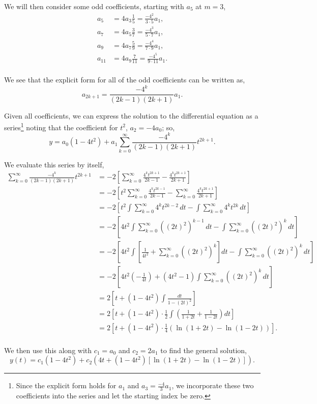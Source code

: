 \documentclass[../hw8]{subfiles}
\begin{document}
We will then consider some odd coefficients, starting with $a_5$ at $m=3$,
\begin{align*}
    a_5&=4a_3\frac{1}{5}=\frac{-4^2}{3\cdot5}a_1,\\
    a_7&=4a_5\frac{3}{7}=\frac{-4^3}{5\cdot7}a_1,\\
    a_9&=4a_7\frac{5}{9}=\frac{-4^4}{7\cdot9}a_1,\\
    a_{11}&=4a_9\frac{7}{11}=\frac{-4^5}{9\cdot11}a_1.\\
\end{align*}

We see that the explicit form for all of the odd coefficients can be written as,
\[a_{2k+1}=\frac{-4^k}{(2k-1)(2k+1)}a_1.\]

Given all coefficients, we can express the solution to the differential equation as a series\footnote{Since the explicit form holds for $a_1$ and $a_3=\frac{-4}{3}a_1$, we incorporate these two coefficients into the series and let the starting index be zero.} noting that the coefficient for $t^2$, $a_2=-4a_0$; so,
\[y=a_0(1-4t^2)+a_1\sum\limits_{k=0}^{\infty}\frac{-4^k}{(2k-1)(2k+1)}t^{2k+1}.\]

We evaluate this series by itself,
\begin{align*}
    \sum\limits_{k=0}^{\infty}\frac{-4^k}{(2k-1)(2k+1)}t^{2k+1}&=-2\left[ \sum\limits_{k=0}^{\infty} \frac{4^k t^{2k+1}}{2k-1}-\frac{4^k t^{2k+1}}{2k+1}\right]\\
    &=-2\left[ t^2 \sum\limits_{k=0}^{\infty}\frac{4^k t^{2k-1}}{2k-1} - \sum\limits_{k=0}^{\infty}\frac{4^k t^{2k+1}}{2k+1} \right]\\
    &=-2\left[ t^2 \int \sum\limits_{k=0}^{\infty}4^k t^{2k-2}\,dt - \int \sum\limits_{k=0}^{\infty}4^k t^{2k}\,dt \right]\\
    &=-2\left[ 4t^2 \int \sum\limits_{k=0}^{\infty}{\left( {(2t)}^2 \right)}^{k-1}\,dt - \int \sum\limits_{k=0}^{\infty}{\left( {(2t)}^2 \right)}^k\,dt\right] \\
    &=-2\left[ 4t^2 \int \left[ \frac{1}{4t^2} + \sum\limits_{k=0}^{\infty}{\left( {(2t)}^2 \right)}^k\right]dt - \int \sum\limits_{k=0}^{\infty}{\left( {(2t)}^2 \right)}^k\,dt\right] \\
    &=-2\left[ 4t^2\left( -\frac{1}{4t} \right) + \left( 4t^2-1 \right)\int \sum\limits_{k=0}^{\infty}{\left( {(2t)}^2 \right)}^k\,dt \right]\\
    &= 2\left[ t + \left( 1-4t^2 \right)\int \frac{dt}{1-{(2t)}^2} \right] \\
    &=2\left[ t+\left( 1-4t^2 \right)\cdot\frac{1}{2}\int \left( \frac{1}{1+2t}+\frac{1}{1-2t} \right)dt \right]\\
    &=2\left[ t+\left( 1-4t^2 \right)\cdot\frac{1}{4}\left( \ln{(1+2t)}-\ln{(1-2t)} \right) \right].\\
\end{align*}

We then use this along with $c_1=a_0$ and $c_2=2a_1$ to find the general solution,
\[y(t)=c_1\left( 1-4t^2 \right)+c_2\left( 4t+\left( 1-4t^2 \right)\left[ \ln{(1+2t)}-\ln{(1-2t)} \right] \right).\]
\end{document}
